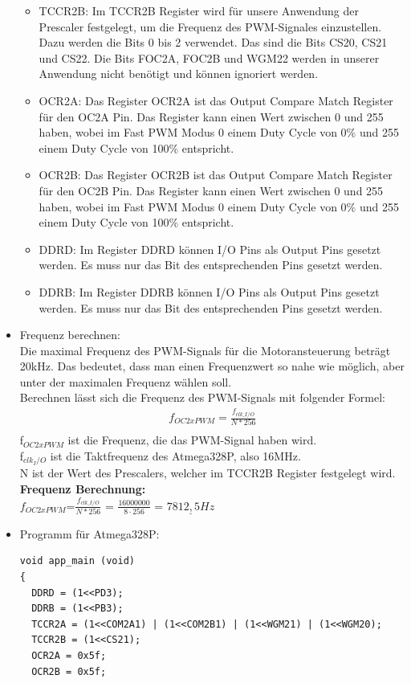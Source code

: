 \begin{itemize}
\begin{itemize}
\begin{itemize}
\end{itemize} 
\item TCCR2B: Im TCCR2B Register wird für unsere Anwendung der Prescaler festgelegt, um die Frequenz des PWM-Signales einzustellen. Dazu werden die Bits 0 bis 2 verwendet. Das sind die Bits CS20, CS21 und CS22. Die Bits FOC2A, FOC2B und WGM22 werden in unserer Anwendung nicht benötigt und können ignoriert werden. \\
\item OCR2A: Das Register OCR2A ist das Output Compare Match Register für den OC2A Pin. Das Register kann einen Wert zwischen 0 und 255 haben, wobei im Fast PWM Modus 0 einem Duty Cycle von 0\% und 255 einem Duty Cycle von 100\% entspricht.\\
\item OCR2B: Das Register OCR2B ist das Output Compare Match Register für den OC2B Pin. Das Register kann einen Wert zwischen 0 und 255 haben, wobei im Fast PWM Modus 0 einem Duty Cycle von 0\% und 255 einem Duty Cycle von 100\% entspricht.\\
\item DDRD: Im Register DDRD können I/O Pins als Output Pins gesetzt werden. Es muss nur das Bit des entsprechenden Pins gesetzt werden.\\
\item DDRB: Im Register DDRB können I/O Pins als Output Pins gesetzt werden. Es muss nur das Bit des entsprechenden Pins gesetzt werden.\\
\end{itemize}
\item Frequenz berechnen:\\
Die maximal Frequenz des PWM-Signals für die Motoransteuerung beträgt 20kHz. Das bedeutet, dass man einen Frequenzwert so nahe wie möglich, aber unter der maximalen Frequenz wählen soll.\\
Berechnen lässt sich die Frequenz des PWM-Signals mit folgender Formel:
\begin{align*}
f_{OC2xPWM}=\frac{f_{clk\_I/O}}{N*256} \\
\end{align*} 
f$_{OC2xPWM}$ ist die Frequenz, die das PWM-Signal haben wird.\\
f$_{clk_I/O}$ ist die Taktfrequenz des Atmega328P, also 16MHz. \\
N ist der Wert des Prescalers, welcher im TCCR2B Register festgelegt wird. \\

\textbf{Frequenz Berechnung:}\\
$f_{OC2xPWM}$=$\frac{f_{clk\_I/O}}{N*256}$ = $\frac{16000000}{8 \cdot 256}$ = $\underline{7812,5Hz}$
\item Programm für Atmega328P: \\
\begin{lstlisting}[caption=$\mu$C-Programm,style=C]
void app_main (void)
{
  DDRD = (1<<PD3);
  DDRB = (1<<PB3);
  TCCR2A = (1<<COM2A1) | (1<<COM2B1) | (1<<WGM21) | (1<<WGM20);
  TCCR2B = (1<<CS21);
  OCR2A = 0x5f;
  OCR2B = 0x5f;
  

\end{lstlisting}
\end{itemize}
